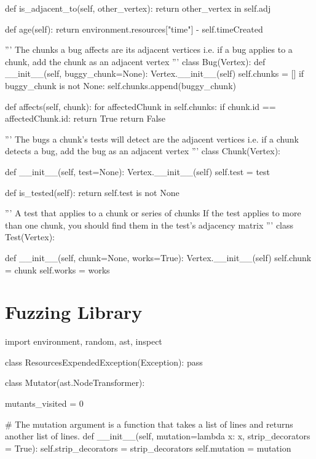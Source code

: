 \begin{appendices}
\begin{pyglist}[language = python, caption={Classes used by sociotechnical environment}, listingname=\textbf{Code Listing} \comment{, fvset={frame=single,framerule=1pt}}, numbers=left]
    def is_adjacent_to(self, other_vertex):
        return other_vertex in self.adj

    def age(self):
        return environment.resources["time"] - self.timeCreated



'''
    The chunks a bug affects are its adjacent vertices
    i.e. if a bug applies to a chunk, add the chunk as an adjacent vertex
'''
class Bug(Vertex):
    def __init__(self, buggy_chunk=None):
        Vertex.__init__(self)
        self.chunks = []
        if buggy_chunk is not None: self.chunks.append(buggy_chunk)

    def affects(self, chunk):
        for affectedChunk in self.chunks:
            if chunk.id == affectedChunk.id:
                return True
        return False


'''
    The bugs a chunk's tests will detect are the adjacent vertices
    i.e. if a chunk detects a bug, add the bug as an adjacent vertex
'''
class Chunk(Vertex):

    def __init__(self, test=None):
        Vertex.__init__(self)
        self.test = test

    def is_tested(self):
        return self.test is not None


'''
    A test that applies to a chunk or series of chunks
    If the test applies to more than one chunk, you should find them in the test's adjacency matrix
'''
class Test(Vertex):

    def __init__(self, chunk=None, works=True):
        Vertex.__init__(self)
        self.chunk = chunk
        self.works = works
\end{pyglist}

\chapter{Fuzzing Library}
\label{appendix:fuzzing_library}

\begin{pyglist}[language = python, caption={Complete fuzzing library}, listingname=\textbf{Code Listing} \comment{, fvset={frame=single,framerule=1pt}}, numbers=left]
import environment, random, ast, inspect

class ResourcesExpendedException(Exception):
    pass


class Mutator(ast.NodeTransformer):

    mutants_visited = 0

    # The mutation argument is a function that takes a list of lines and returns another list of lines.
    def __init__(self, mutation=lambda x: x, strip_decorators = True):
        self.strip_decorators = strip_decorators
        self.mutation = mutation


\end{pyglist}
\end{appendices}
